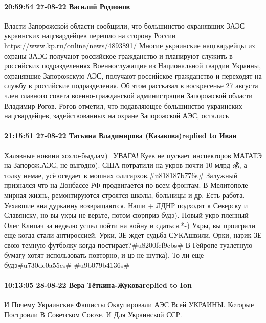 \paragraph{20:59:54 27-08-22 Василий Родионов}

Власти Запорожской области сообщили, что большинство охранявших ЗАЭС украинских нацгвардейцев перешло на сторону России
https://www.kp.ru/online/news/4893891/
Многие украинские нацгвардейцы из охраны ЗАЭС получают российское гражданство и планируют служить в российских подразделениях
Военнослужащие из Национальной гвардии Украины, охранявшие Запорожскую АЭС, получают российское гражданство и переходят на службу в российские подразделения. Об этом рассказал в воскресенье 27 августа член главного совета военно-гражданской администрации Запорожской области Владимир Рогов.
Рогов отметил, что подавляющее большинство украинских нацгвардейцев, задействованных на охране Запорожской АЭС, остались

\paragraph{21:15:51 27-08-22 Татьяна Владимирова (Казакова)replied to Иван}

Халявные новини хохло-быдлам)=УВАГА! Куев не пускает инспекторов МАГАТЭ на
Запорож.АЭС, не выгодно). США потратили на укров почти 10 млрд 💰, а толку
немае, усё оседает в мошнах олигархов.#u818187b776s# Залужный признался что на
Донбассе РФ продвигается по всем фронтам. В Мелитополе мирная жизнь,
ремонтируются-строятся школы, больницы и др. Есть работа. Уехавшие вна дуркаину
возвращаются. Наши + ЛДНР подходят к Северску и Славянску, но вы укры не
верьте, потом сюрприз будэ). Новый укро пленный Олег Клипач за неделю успел
пойти на войну и сдаться.*-) Укры, вы проиграли еще когда стали антироссией.
Урки, ЗЕ ждет судьба СУКАшвили. Орки, нарик ЗЕ свою темную футболку когда
постирает?#u8200fcf9cbs# В Гейропе туалетную бумагу хотят использовать
повторно, и цэ не шутка). То ли еще будэ#u730de0a55cs# #u9b079b4136s#

\paragraph{10:13:05 28-08-22 Вера Тёткина-Жуковаreplied to Ion}

И Почему Украинские Фашисты Оккупировали АЭС Всей УКРАИНЫ. Которые Построили В
Советском Союзе.
И Для Украинской ССР.


